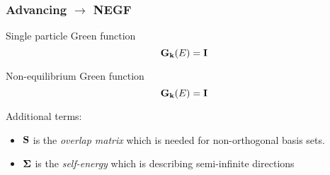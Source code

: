 \begin{frame}
  \frametitle{Advancing $\to$ NEGF}

  \begin{block}{Single particle Green function}
    \begin{equation*}
      [(E+\im\eta)\ID - \HH_\kk]\G_\kk(E) = \ID
    \end{equation*}
  \end{block}

  \begin{block}{Non-equilibrium Green function}
    \begin{equation*}
      [(E+\im\eta)\SO - \HH_\kk - \sum_\idxE \SE_{\idxE,\kk}(E-\mu_\idxE)]\G_\kk(E) = \ID
    \end{equation*}

    Additional terms:
    \begin{itemize}
      \item%
      $\mathbf{S}$ is the \emph{overlap matrix} which is needed for non-orthogonal basis sets.

      \item%
      $\boldsymbol{\Sigma}$ is the \emph{self-energy} which is describing semi-infinite directions

    \begin{center}
      
      \begin{columns}

\end{columns}
\end{center}
\end{itemize}
\end{block}
\end{frame}
